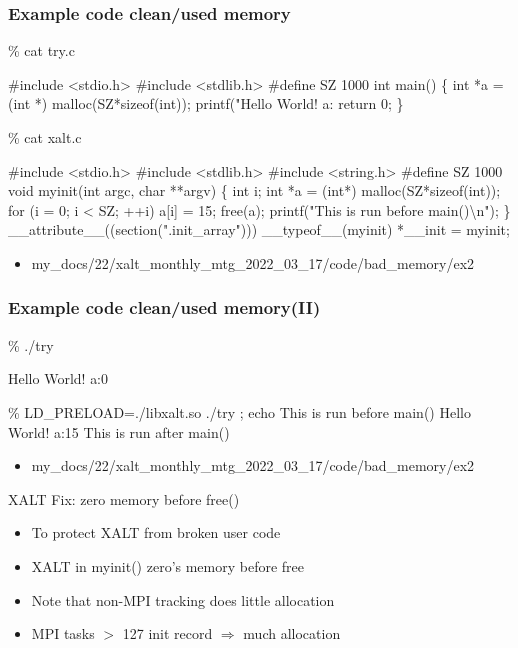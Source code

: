 \documentclass{beamer}
\begin{document}
\begin{frame}[fragile]
    \frametitle{Example code clean/used memory}
 {\tiny
    \begin{semiverbatim}
\% cat try.c

#include <stdio.h>
#include <stdlib.h>
#define SZ 1000
int main()
\{
  int *a = (int *) malloc(SZ*sizeof(int));
  printf("Hello World! a:%
  return 0;
\}

\% cat xalt.c

#include <stdio.h>
#include <stdlib.h>
#include <string.h>
#define SZ 1000
void myinit(int argc, char **argv)
\{
  int i;
  int *a = (int*) malloc(SZ*sizeof(int));
  for (i = 0; i < SZ; ++i) a[i] = 15; 
  free(a);
  printf("This is run before main()\textbackslash{}n");
\}
\_\_attribute\_\_((section(".init\_array"))) \_\_typeof\_\_(myinit) *\_\_init = myinit;
    \end{semiverbatim}
}

  \begin{itemize}
    \item my\_docs/22/xalt\_monthly\_mtg\_2022\_03\_17/code/bad\_memory/ex2
  \end{itemize}
\end{frame}

\begin{frame}[fragile]
    \frametitle{Example code clean/used memory(II)}
 {\small
   \begin{semiverbatim}
\% ./try

Hello World! {\color{blue} a:0}

\% LD\_PRELOAD=./libxalt.so  ./try  ; echo
This is run before main()
Hello World! {\color{red} a:15}
This is run after main()
    \end{semiverbatim}
}
  \begin{itemize}
    \item my\_docs/22/xalt\_monthly\_mtg\_2022\_03\_17/code/bad\_memory/ex2
  \end{itemize}
\end{frame}

\begin{frame}{XALT Fix: zero memory before free()}
  \begin{itemize}
    \item To protect XALT from broken user code
    \item XALT in myinit() zero's memory before free
    \item Note that non-MPI tracking does little allocation
    \item MPI tasks $>$ 127 init record $\Rightarrow$ much allocation
  \end{itemize}
\end{frame}
\end{document}
